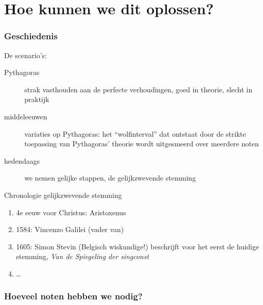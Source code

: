 \documentclass[compress, darktitle, framenumber, totalframenumber]{beamer}
\begin{document}
\section{Hoe kunnen we dit oplossen?}

\begin{frame}
  \frametitle{Geschiedenis}

  De scenario's:
  \begin{description}
    \item[Pythagoras] strak vasthouden aan de perfecte verhoudingen, goed in theorie, slecht in praktijk
    \item[middeleeuwen] variaties op Pythagoras: het ``wolfinterval'' dat ontstaat door de strikte toepassing van Pythagoras' theorie wordt uitgesmeerd over meerdere noten
    \item[hedendaags] we nemen gelijke stappen, de \alert{gelijkzwevende stemming}
  \end{description}
  \pause
  \begin{block}{Chronologie gelijkzwevende stemming}
    \begin{enumerate}
      \item 4e eeuw voor Christus: Aristoxenus
      \item 1584: Vincenzo Galilei (vader van)
      \item 1605: Simon Stevin (Belgisch wiskundige!) beschrijft voor het eerst de huidige stemming, \emph{Van de Spiegeling der singconst}
      \item \ldots
    \end{enumerate}
  \end{block}
\end{frame}

\begin{frame}
  \frametitle{Hoeveel noten hebben we nodig?}

  \begin{center}
  \end{center}
\end{frame}
\end{document}
